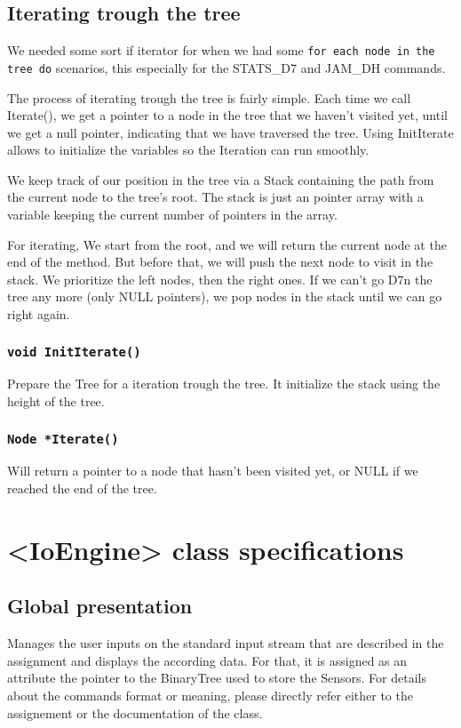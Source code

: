 \documentclass[10pt]{article}
\begin{document}
\subsection{Iterating trough the tree}

We needed some sort if iterator for when we had some \texttt{for each node in the tree do} scenarios, this especially for the STATS\_D7 and JAM\_DH commands.

The process of iterating trough the tree is fairly simple. Each time we call Iterate(), we get a pointer to a node in the tree that we haven’t visited yet, until we get a null pointer, indicating that we have traversed the tree. Using InitIterate allows to initialize the variables so the Iteration can run smoothly.

We keep track of our position in the tree via a Stack containing the path from the current node to the tree's root. The stack is just an pointer array with a variable keeping the current number of pointers in the array.

For iterating, We start from the root, and we will return the current node at the end of the method. But before that, we will push the next node to visit in the stack. We prioritize the left nodes, then the right ones. If we can't go D7n the tree any more (only NULL pointers), we pop nodes in the stack until we can go right again.

\subsubsection*{\tt void InitIterate()}
Prepare the Tree for a iteration trough the tree. It initialize the stack using the height of the tree.

\subsubsection*{\tt Node *Iterate()}
Will return a pointer to a node that hasn't been visited yet, or NULL if we reached the end of the tree.
 
\section{<IoEngine> class specifications}
\subsection{Global presentation}
Manages the user inputs on the standard input stream that are described in the assignment and displays the according data. For that, it is assigned as an attribute the pointer to the BinaryTree used to store the Sensors. For details about the commands format or meaning, please directly refer either to the assignement or the documentation of the class.
\end{document}

